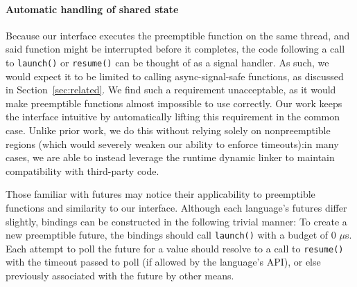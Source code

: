 \paragraph{Automatic handling of shared state}
Because our interface executes the preemptible function on the same thread, and said
function might be interrupted before it completes, the code following a call to
\texttt{launch()} or \texttt{resume()} can be thought of as a signal handler.  As
such, we would expect it to be limited to calling async-signal-safe functions, as
discussed in Section~\ref{sec:related}.  We find such a requirement unacceptable, as
it would make preemptible functions almost impossible to use correctly.  Our work
keeps the interface intuitive by automatically lifting this requirement in the common
case.  Unlike prior work, we do this without relying solely on nonpreemptible regions
(which would severely weaken our ability to enforce timeouts):\@ in many cases, we
are able to instead leverage the runtime dynamic linker to maintain compatibility
with third-party code.

Those familiar with futures may notice their applicability to preemptible functions
and similarity to our interface.  Although each language's futures differ slightly,
bindings can be constructed in the following trivial manner:
To create a new preemptible future, the bindings should call \texttt{launch()} with a
budget of 0 $\mu$s.  Each attempt to poll the future for a value should resolve to a
call to \texttt{resume()} with the timeout passed to poll (if allowed by the
language's API), or else previously associated with the future by other means.

